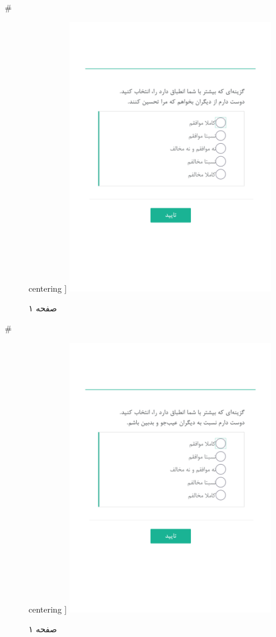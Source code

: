 { 
 # 
\begin{figure}[htpb]
centering ]
\includegraphics[width=0.8\textwidth]{./img/Task27.png/}
\caption{صفحه ۱}
\label{fig:Task1}
\end{figure}
 
 
 # 
\begin{figure}[htpb]
centering ]
\includegraphics[width=0.8\textwidth]{./img/Task28.png/}
\caption{صفحه ۱}
\label{fig:Task1}
\end{figure}
 
}
